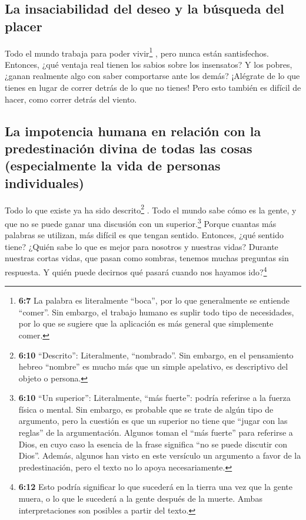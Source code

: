 \hypertarget{la-insaciabilidad-del-deseo-y-la-buxfasqueda-del-placer}{%
\subsection{La insaciabilidad del deseo y la búsqueda del
placer}\label{la-insaciabilidad-del-deseo-y-la-buxfasqueda-del-placer}}

 Todo el mundo trabaja para poder vivir\footnote{\textbf{6:7}
  La palabra es literalmente ``boca'', por lo que generalmente se
  entiende ``comer''. Sin embargo, el trabajo humano es suplir todo tipo
  de necesidades, por lo que se sugiere que la aplicación es más general
  que simplemente comer.} , pero nunca están santisfechos.
 Entonces, ¿qué ventaja real tienen los sabios sobre los
insensatos? Y los pobres, ¿ganan realmente algo con saber comportarse
ante los demás?  ¡Alégrate de lo que tienes en lugar de
correr detrás de lo que no tienes! Pero esto también es difícil de
hacer, como correr detrás del viento.

\hypertarget{la-impotencia-humana-en-relaciuxf3n-con-la-predestinaciuxf3n-divina-de-todas-las-cosas-especialmente-la-vida-de-personas-individuales}{%
\subsection{La impotencia humana en relación con la predestinación
divina de todas las cosas (especialmente la vida de personas
individuales)}\label{la-impotencia-humana-en-relaciuxf3n-con-la-predestinaciuxf3n-divina-de-todas-las-cosas-especialmente-la-vida-de-personas-individuales}}

 Todo lo que existe ya ha sido descrito\footnote{\textbf{6:10}
  ``Descrito'': Literalmente, ``nombrado''. Sin embargo, en el
  pensamiento hebreo ``nombre'' es mucho más que un simple apelativo, es
  descriptivo del objeto o persona.} . Todo el mundo sabe cómo es la
gente, y que no se puede ganar una discusión con un superior.\footnote{\textbf{6:10}
  ``Un superior'': Literalmente, ``más fuerte'': podría referirse a la
  fuerza física o mental. Sin embargo, es probable que se trate de algún
  tipo de argumento, pero la cuestión es que un superior no tiene que
  ``jugar con las reglas'' de la argumentación. Algunos toman el ``más
  fuerte'' para referirse a Dios, en cuyo caso la esencia de la frase
  significa ``no se puede discutir con Dios''. Además, algunos han visto
  en este versículo un argumento a favor de la predestinación, pero el
  texto no lo apoya necesariamente.}  Porque cuantas más
palabras se utilizan, más difícil es que tengan sentido. Entonces, ¿qué
sentido tiene?  ¿Quién sabe lo que es mejor para nosotros
y nuestras vidas? Durante nuestras cortas vidas, que pasan como sombras,
tenemos muchas preguntas sin respuesta. Y quién puede decirnos qué
pasará cuando nos hayamos ido?\footnote{\textbf{6:12} Esto podría
  significar lo que sucederá en la tierra una vez que la gente muera, o
  lo que le sucederá a la gente después de la muerte. Ambas
  interpretaciones son posibles a partir del texto.}

